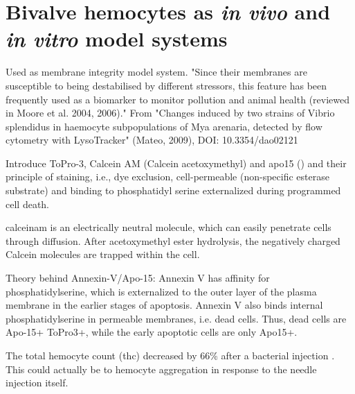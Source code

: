 \section{Bivalve hemocytes as \emph{in vivo} and \emph{in vitro} model systems}
Used as membrane integrity model system. "Since their membranes are susceptible to being destabilised by different stressors, this feature has been frequently used as a biomarker to monitor pollution and animal health (reviewed in Moore et al. 2004, 2006)." From "Changes induced by two strains of Vibrio splendidus in haemocyte subpopulations of Mya arenaria, detected by flow cytometry with LysoTracker" (Mateo, 2009), DOI: 10.3354/dao02121 

Introduce ToPro-3, Calcein AM (Calcein acetoxymethyl) and \acrshort{apo15} (\cite{Barth2020}) and their principle of staining, i.e., dye exclusion, cell-permeable (non-specific esterase substrate) and binding to phosphatidyl serine externalized during programmed cell death.

\acrshort{calceinam} is an electrically neutral molecule, which can easily penetrate cells through diffusion. After acetoxymethyl ester hydrolysis, the negatively charged Calcein molecules are trapped within the cell.

Theory behind Annexin-V/Apo-15: Annexin V
has affinity for phosphatidylserine, which is externalized to the
outer layer of the plasma membrane in the earlier stages of apoptosis. Annexin V also binds internal phosphatidylserine in permeable membranes, i.e. dead cells. Thus, dead cells are Apo-15+ ToPro3+, while the early apoptotic cells are only Apo15+.

The total hemocyte count (\acrshort{thc}) decreased by 66\% after a bacterial injection \cite{Parisi2008}. This could actually be to hemocyte aggregation in response to the needle injection itself.